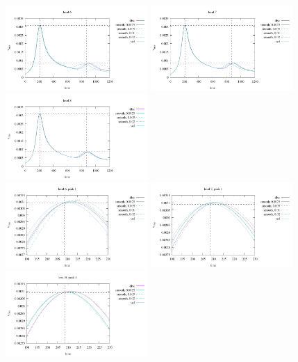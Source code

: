 \begin{itemize}
\begin{center}
\includegraphics[width=5.4cm]{images/benchmark_vaks97/vrms6}
\includegraphics[width=5.4cm]{images/benchmark_vaks97/vrms7}
\includegraphics[width=5.4cm]{images/benchmark_vaks97/vrms8}\\
\includegraphics[width=5.4cm]{images/benchmark_vaks97/vrms6_peak1}
\includegraphics[width=5.4cm]{images/benchmark_vaks97/vrms7_peak1}
\includegraphics[width=5.4cm]{images/benchmark_vaks97/vrms8_peak1}\\

\end{center}
\end{itemize}
